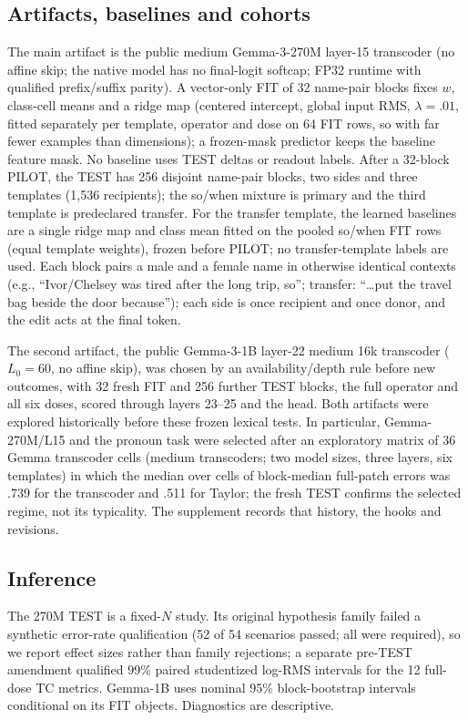 \documentclass[11pt]{article}
\begin{document}
\subsection{Artifacts, baselines and cohorts}
The main artifact is the public medium Gemma-3-270M layer-15 transcoder (no affine skip; the native model has no final-logit softcap; FP32 runtime with qualified prefix/suffix parity). A vector-only FIT of 32 name-pair blocks fixes $w$, class-cell means and a ridge map (centered intercept, global input RMS, $\lambda=.01$, fitted separately per template, operator and dose on 64 FIT rows, so with far fewer examples than dimensions); a frozen-mask predictor keeps the baseline feature mask. No baseline uses TEST deltas or readout labels. After a 32-block PILOT, the TEST has 256 disjoint name-pair blocks, two sides and three templates (1,536 recipients); the so/when mixture is primary and the third template is predeclared transfer. For the transfer template, the learned baselines are a single ridge map and class mean fitted on the pooled so/when FIT rows (equal template weights), frozen before PILOT; no transfer-template labels are used. Each block pairs a male and a female name in otherwise identical contexts (e.g., ``Ivor/Chelsey was tired after the long trip, so''; transfer: ``\ldots put the travel bag beside the door because''); each side is once recipient and once donor, and the edit acts at the final token.

The second artifact, the public Gemma-3-1B layer-22 medium 16k transcoder ($L_0=60$, no affine skip), was chosen by an availability/depth rule before new outcomes, with 32 fresh FIT and 256 further TEST blocks, the full operator and all six doses, scored through layers 23--25 and the head. Both artifacts were explored historically before these frozen lexical tests. In particular, Gemma-270M/L15 and the pronoun task were selected after an exploratory matrix of 36 Gemma transcoder cells (medium transcoders; two model sizes, three layers, six templates) in which the median over cells of block-median full-patch errors was .739 for the transcoder and .511 for Taylor; the fresh TEST confirms the selected regime, not its typicality. The supplement records that history, the hooks and revisions.

\subsection{Inference}
The 270M TEST is a fixed-$N$ study. Its original hypothesis family failed a synthetic error-rate qualification (52 of 54 scenarios passed; all were required), so we report effect sizes rather than family rejections; a separate pre-TEST amendment qualified 99\% paired studentized log-RMS intervals for the 12 full-dose TC metrics. Gemma-1B uses nominal 95\% block-bootstrap intervals conditional on its FIT objects. Diagnostics are descriptive.
\end{document}
